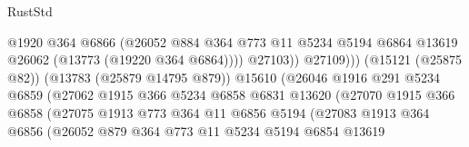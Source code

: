 \begin{lexlean}{RustStd}
\begin{coremodule}
                                            @1920
                                            @364
                                            @6866
                                            (@26052
                                              @884
                                              @364
                                              @773
                                              @11
                                              @5234
                                              @5194
                                              @6864
                                              @13619
                                              @26062
                                              (@13773 (@19220 @364 @6864))))
                                          @27103))
                                      @27109)))
                                (@15121 (@25875 @82))
                                (@13783 (@25879 @14795 @879))
                                @15610
                                (@26046
                                  @1916
                                  @291
                                  @5234
                                  @6859
                                  (@27062
                                    @1915
                                    @366
                                    @5234
                                    @6858
                                    @6831
                                    @13620
                                    (@27070
                                      @1915
                                      @366
                                      @6858
                                      (@27075
                                        @1913
                                        @773
                                        @364
                                        @11
                                        @6856
                                        @5194
                                        (@27083
                                          @1913
                                          @364
                                          @6856
                                          (@26052
                                            @879
                                            @364
                                            @773
                                            @11
                                            @5234
                                            @5194
                                            @6854
                                            @13619

\end{coremodule}
\end{lexlean}
